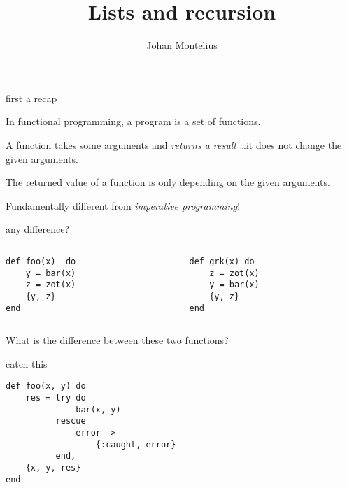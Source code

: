 

\title[ID1019 Recursion]{Lists and recursion}


\author{Johan Montelius}
\date{\semester}



\begin{frame}
\titlepage
\end{frame}

\begin{frame}{first a recap}

\pause In functional programming, a program is a set of functions.

\vspace{20pt}\pause A function takes some arguments and {\em returns a result} \ldots it does not change the given arguments.

\vspace{20pt}\pause The returned value of a function is only depending on the given arguments.

\vspace{20pt}\pause Fundamentally different from {\em imperative programming}!


\end{frame}

\begin{frame}[fragile]{any difference?}

\begin{columns}
 \begin{column}{0.5\linewidth}
\begin{verbatim} 
def foo(x)  do
    y = bar(x)
    z = zot(x)
    {y, z}
end
\end{verbatim}
 \end{column}
 \pause  
  \begin{column}{0.5\linewidth}
\begin{verbatim} 
def grk(x) do
    z = zot(x)
    y = bar(x)
    {y, z}
end
\end{verbatim}
 \end{column}
\end{columns}

\vspace{40pt} 
\pause What is the difference between these two functions?

\end{frame}

\begin{frame}[fragile]{catch this}
\begin{verbatim}
def foo(x, y) do
    res = try do
              bar(x, y)
          rescue
              error ->
                  {:caught, error}
          end,
    {x, y, res}
end
\end{verbatim}
\end{frame}

